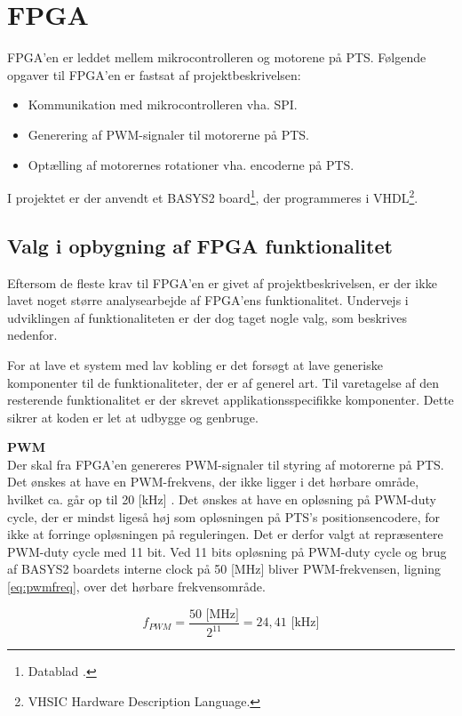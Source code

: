 \section{FPGA}
\label{sec:FPGA}
FPGA'en er leddet mellem mikrocontrolleren og motorene på PTS.
Følgende opgaver til FPGA'en er fastsat af projektbeskrivelsen:

\begin{itemize}
\itemsep1pt
	\item Kommunikation med mikrocontrolleren vha. SPI.
	\item Generering af PWM-signaler til motorerne på PTS.
	\item Optælling af motorernes rotationer vha. encoderne på PTS.
\end{itemize}
I projektet er der anvendt et BASYS2 board\footnote{Datablad \citep{basys2}.}, der programmeres i VHDL\footnote{VHSIC Hardware Description Language.}.

\subsection{Valg i opbygning af FPGA funktionalitet}
Eftersom de fleste krav til FPGA'en er givet af projektbeskrivelsen, er der ikke 
lavet noget større analysearbejde af FPGA'ens funktionalitet. Undervejs i 
udviklingen af funktionaliteten er der dog taget nogle valg, som beskrives nedenfor.

For at lave et system med lav kobling er det forsøgt at lave 
generiske komponenter til de funktionaliteter, der er af generel art. 
Til varetagelse af den resterende funktionalitet er der skrevet applikationsspecifikke 
komponenter.
Dette sikrer at koden er let at udbygge og genbruge.

\textbf{PWM}\\
Der skal fra FPGA'en genereres PWM-signaler til styring af motorerne på PTS.
Det ønskes at have en PWM-frekvens, der ikke ligger i det hørbare område, hvilket ca. går op til 20 [kHz] \citep{Hearingrange}. 
Det ønskes at have en opløsning på PWM-duty cycle, der er mindst ligeså høj som 
opløsningen på PTS's positionsencodere, for ikke at forringe opløsningen på reguleringen. 
Det er derfor valgt at repræsentere PWM-duty cycle med 11 bit. 
Ved 11 bits opløsning på PWM-duty cycle og brug af BASYS2 boardets interne clock på 50 [MHz] bliver PWM-frekvensen,
ligning \ref{eq:pwmfreq}, over det hørbare frekvensområde.

\begin{equation}
  f_{PWM}=\frac{50 \text{ [MHz]}}{2^{11}} = 24,41 \text{ [kHz]}
	\label{eq:pwmfreq}
\end{equation}

